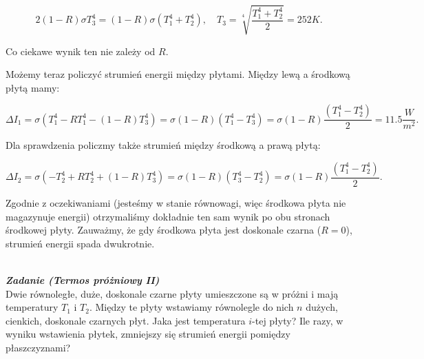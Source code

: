 \documentclass[11pt,a4paper]{article}
\newcounter{zadanie}\newcommand{\zadanie}[1][]{\addtocounter{zadanie}{1} ~\\  {\bf \emph{Zadanie \arabic{zadanie} #1 }} \\}
\begin{document}
\begin{equation}
2(1-R) \sigma T_3^4 = (1-R) \sigma (T_1^4+T_2^4), \quad T_3 = \sqrt[4]{\frac{T_1^4+T_2^4}{2}}= 252 K.
\end{equation}

Co ciekawe wynik ten nie zależy od $R$.

Możemy teraz policzyć strumień energii między płytami. Między lewą a środkową płytą mamy:

\begin{equation}
  \Delta I_1 = \sigma (  T_1^4- R T_1^4 - (1-R)T_3^4) = \sigma (1-R) (T_1^4-T_3^4) =
  \sigma(1-R) \frac{(T_1^4-T_2^4)}{2} = 11.5 \frac{W}{m^2}.
\end{equation}

Dla sprawdzenia policzmy także strumień między środkową a prawą płytą:

\begin{equation}
  \Delta I_2 = \sigma (  -T_2^4 + R T_2^4 + (1-R)T_3^4) =
  \sigma (1-R) (T_3^4-T_2^4) = \sigma(1-R) \frac{(T_1^4-T_2^4)}{2}.
\end{equation}

Zgodnie z oczekiwaniami (jesteśmy w stanie równowagi, więc środkowa płyta nie magazynuje energii)
otrzymaliśmy dokładnie ten sam wynik po obu stronach środkowej płyty. Zauważmy, że gdy środkowa płyta
jest doskonale czarna ($R=0$), strumień energii spada dwukrotnie.

\newpage
\zadanie [(Termos próżniowy II)]
Dwie równoległe, duże, doskonale czarne płyty umieszczone są w próżni i mają temperatury $T_1$ i $T_2$.
Między te płyty wstawiamy równolegle do nich $n$ dużych, cienkich, doskonale czarnych płyt.
Jaka jest temperatura $i$-tej płyty? 
Ile razy, w wyniku wstawienia płytek, zmniejszy się strumień energii pomiędzy płaszczyznami? 

\end{document}
